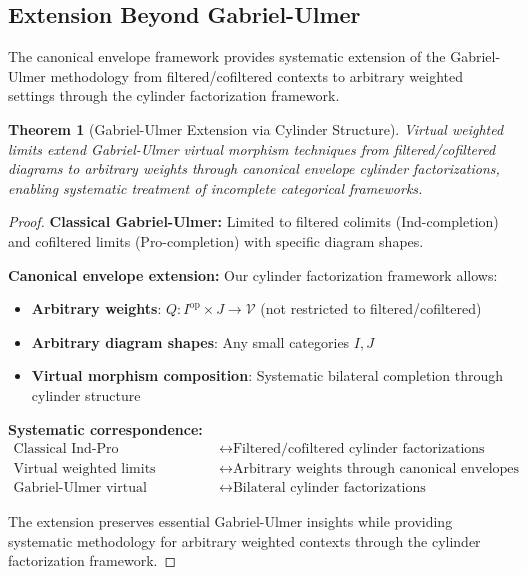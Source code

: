 \documentclass[11pt]{article}
\theoremstyle{plain}
\newtheorem{theorem}{Theorem}[section]
\theoremstyle{definition}
\theoremstyle{remark}
\newcommand{\V}{\mathcal{V}}
\newcommand{\op}{\mathrm{op}}
\begin{document}
\subsection{Extension Beyond Gabriel-Ulmer}

The canonical envelope framework provides systematic extension of the Gabriel-Ulmer methodology \cite{gabriel1971lokal} from filtered/cofiltered contexts to arbitrary weighted settings through the cylinder factorization framework.

\begin{theorem}[Gabriel-Ulmer Extension via Cylinder Structure]
Virtual weighted limits extend Gabriel-Ulmer virtual morphism techniques from filtered/cofiltered diagrams to arbitrary weights through canonical envelope cylinder factorizations, enabling systematic treatment of incomplete categorical frameworks.
\end{theorem}

\begin{proof}
\textbf{Classical Gabriel-Ulmer:} Limited to filtered colimits (Ind-completion) and cofiltered limits (Pro-completion) with specific diagram shapes.

\textbf{Canonical envelope extension:} Our cylinder factorization framework allows:
\begin{itemize}
\item \textbf{Arbitrary weights}: $Q : I^{\op} \times J \to \V$ (not restricted to filtered/cofiltered)
\item \textbf{Arbitrary diagram shapes}: Any small categories $I, J$
\item \textbf{Virtual morphism composition}: Systematic bilateral completion through cylinder structure
\end{itemize}

\textbf{Systematic correspondence:}
\begin{align}
\text{Classical Ind-Pro} &\longleftrightarrow \text{Filtered/cofiltered cylinder factorizations} \\
\text{Virtual weighted limits} &\longleftrightarrow \text{Arbitrary weights through canonical envelopes} \\
\text{Gabriel-Ulmer virtual morphisms} &\longleftrightarrow \text{Bilateral cylinder factorizations}
\end{align}

The extension preserves essential Gabriel-Ulmer insights while providing systematic methodology for arbitrary weighted contexts through the cylinder factorization framework.
\end{proof}
\end{document}
